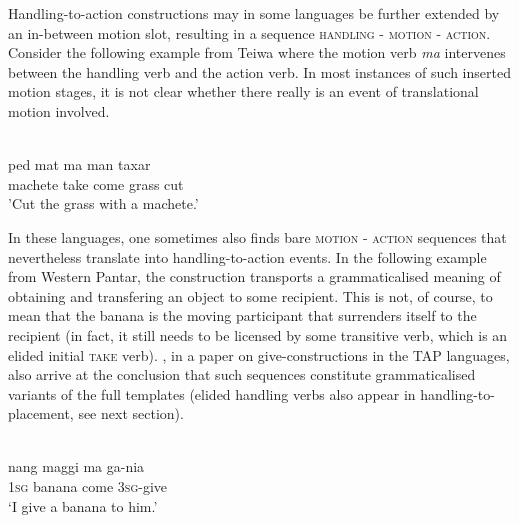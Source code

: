 Handling-to-action constructions may in some languages be further extended by an in-between motion slot, resulting in a sequence \textsc{handling - motion - action}. Consider the following example from Teiwa where the motion verb \textit{ma} intervenes between the handling verb and the action verb. In most instances of such inserted motion stages, it is not clear whether there really is an event of translational motion involved.

\ea 
{}\\
\gll ped mat ma man taxar \\
machete take come grass cut \\
\glft 'Cut the grass with a machete.'\\ 
\z

In these languages, one sometimes also finds bare \textsc{motion - action} sequences that nevertheless translate into handling-to-action events. In the following example from Western Pantar, the construction transports a grammaticalised meaning of obtaining and transfering an object to some recipient. This is not, of course, to mean that the banana is the moving participant that surrenders itself to the recipient (in fact, it still needs to be licensed by some transitive verb, which is an elided initial \textsc{take} verb). \citet{klamer2012development}, in a paper on give-constructions in the TAP languages, also arrive at the conclusion that such sequences constitute grammaticalised variants of the full templates (elided handling verbs also appear in handling-to-placement, see next section).

\ea 
{}\\
\gll nang maggi ma ga-nia \\
\textsc{1}\textsc{sg} banana come \textsc{3}\textsc{sg}-give \\
\glft ‘I give a banana to him.’\\ 
\z

